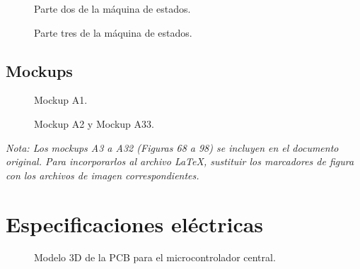 \documentclass[11pt,tesis,twoside,openright,spanish]{upiiztt}
\begin{document}
\begin{figure}[H]
  \centering
  \caption{Parte dos de la máquina de estados.}
  \label{fig:estados_p2}
\end{figure}

\begin{figure}[H]
  \centering
  \caption{Parte tres de la máquina de estados.}
  \label{fig:estados_p3}
\end{figure}

\section*{Mockups}

\begin{figure}[H]
  \centering
  \caption{Mockup A1.}
  \label{fig:mockup_a1}
\end{figure}

\begin{figure}[H]
  \centering
  \caption{Mockup A2 y Mockup A33.}
  \label{fig:mockup_a2}
\end{figure}

\noindent\textit{Nota: Los mockups A3 a A32 (Figuras 68 a 98) se incluyen en el documento original. Para incorporarlos al archivo \LaTeX{}, sustituir los marcadores de figura con los archivos de imagen correspondientes.}
\chapter{Especificaciones eléctricas}
\label{ap:especificaciones_electricas}

\begin{figure}[H]
  \centering
  \caption{Modelo 3D de la PCB para el microcontrolador central.}
  \label{fig:pcb3d_1}
\end{figure}
\end{document}

